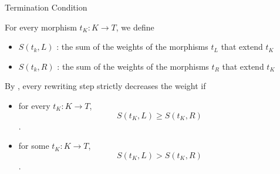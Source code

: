\documentclass{beamer}
\begin{document}
\begin{frame}{ 
  Termination Condition
  }

  For every morphism $t_K: K \rightarrow T$, we define
\begin{itemize}
  \item $S(t_k,L)$ : the sum of the weights of the morphisms $t_L$ that extend $t_K$
  \item $S(t_k,R)$ : the sum of the weights of the morphisms $t_R$ that extend $t_K$
\end{itemize}
  
By \cite[Lemma 5.13]{endrullis2024generalized_arxiv_v2}, every rewriting step strictly decreases the weight if 
\begin{itemize}
  \item for every $t_K: K \rightarrow T$, 
  $$ S(t_K,L) \mathop{\geq} S(t_K,R) $$.
   \item for some $t_K: K \rightarrow T$,
  $$ S(t_K,L) \mathop{>} S(t_K,R) $$.
\end{itemize} 

\end{frame}
\end{document}
